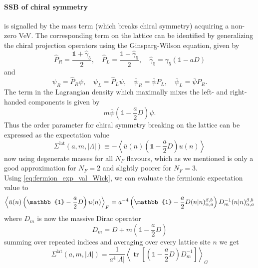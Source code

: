 \documentclass[a4paper,10pt]{article}
\begin{document}
\paragraph{SSB of chiral symmetry} is signalled by the mass term (which breaks chiral symmetry) acquiring a non- zero VeV. The corresponding term on the lattice can be identified by generalizing the chiral projection operators using the Ginsparg-Wilson equation, given by
\begin{equation}
\widehat{P}_{R}=\frac{\mathbb{1}+\widehat{\gamma}_{5}}{2}, \quad \widehat{P}_{L}=\frac{\mathbb{1}-\widehat{\gamma}_{5}}{2}, \quad \widehat{\gamma}_{5}=\gamma_{5}(\mathbb{1}-a D)
\end{equation}
and
\begin{equation}
\psi_{R}=\widehat{P}_{R} \psi, \quad \psi_{L}=\widehat{P}_{L} \psi, \quad \bar{\psi}_{R}=\bar{\psi} P_{L}, \quad \bar{\psi}_{L}=\bar{\psi} P_{R}.
\end{equation}
The term in the Lagrangian density which maximally mixes the left- and right-handed components is given by
\begin{equation}
m \bar{\psi}\left(\mathbb{1}-\frac{a}{2} D\right) \psi.
\end{equation}
Thus the order parameter for chiral symmetry breaking on the lattice can be expressed as the expectation value 
\begin{equation}
\Sigma^{\mathrm{lat}}(a, m,|\Lambda|) \equiv-\left\langle\bar{u}(n)\left(\mathbb{1}-\frac{a}{2} D\right) u(n)\right\rangle
\end{equation}
now using degenerate masses for all $N_F$ flavours, which as we mentioned is only a good approximation for $N_F =2$ and slightly poorer for $N_F=3$.\\Using \eqref{eq:fermion_exp_val_Wick}, we can evaluate the fermionic expectation value to
\begin{equation}
\left\langle\bar{u}(n)\left(\mathbb{1}-\frac{a}{2} D\right) u(n)\right\rangle_F = a^{-4}\left(\mathbb{1}-\frac{a}{2} D(n\mkern-5mu \mid\mkern-5mu n)_{\alpha,a}^{ \beta,b}\right)D_m^{-1}(n\mkern-5mu \mid\mkern-5mu n)_{\alpha,a}^{ \beta,b}
\end{equation}
where $D_m$ is now the massive Dirac operator 
\begin{equation}
 D_m = D+m\left(\mathbb{1}-\frac{a}{2} D\right)
\end{equation} 
summing over repeated indices and averaging over every lattice site $n$ we get 
\begin{equation}\label{eq:chiral_condensate_exp_val}
\Sigma^{\operatorname{lat}}(a, m,|\Lambda|)=\frac{1}{a^{4}|\Lambda|}\left\langle\operatorname{tr}\left[\left(\mathbb{1}-\frac{a}{2} D\right) D_{m}^{-1}\right]\right\rangle_{G}
\end{equation}
\end{document}
